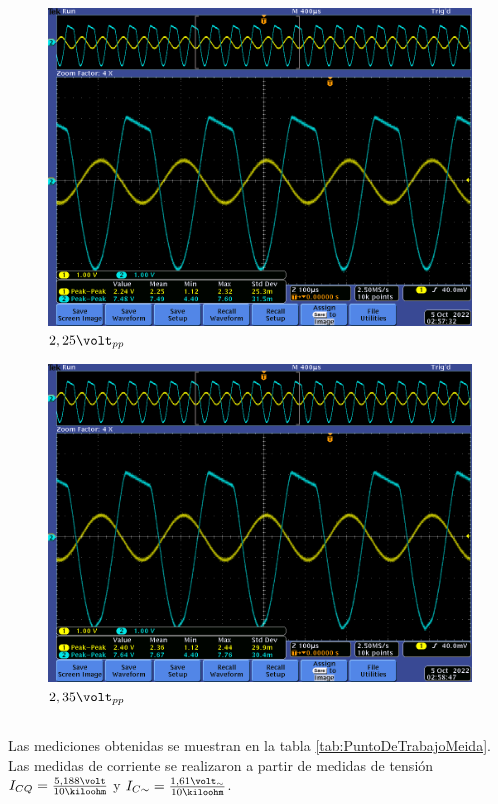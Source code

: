 \documentclass[12pt,letterpaper]{article}     %
\begin{document}
{\begin{figure}[!ht]
\centering
\includegraphics[scale=0.5]{imagenes/11.png}
\caption{$2,25\volt_{pp}$}
\label{fig:11}
\end{figure}

\begin{figure}[!ht]
\centering
\includegraphics[scale=0.5]{imagenes/12.png}
\caption{$2,35\volt_{pp}$}
\label{fig:12}
\end{figure}

\clearpage
\subsection{}

Las mediciones obtenidas se muestran en la tabla \ref{tab:PuntoDeTrabajoMeida}.
Las medidas de corriente se realizaron a partir de medidas de tensión
$I_{CQ} = \frac{5,188\volt}{10\kiloohm}$ y
$I_{C\sim} = \frac{1,61\volt_{\sim}}{10\kiloohm}$.

}
\end{document}
